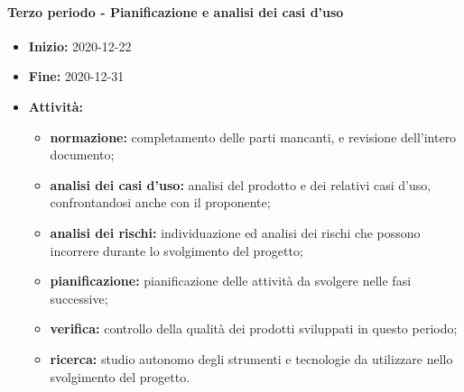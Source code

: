 \paragraph[Terzo periodo]{Terzo periodo - \textnormal{Pianificazione e analisi dei casi d'uso}}
\begin{itemize}
    \item [] \textbf{Inizio:} 2020-12-22
    \item [] \textbf{Fine:} 2020-12-31
    \item [] \textbf{Attività:}
          \begin{itemize}
              \item \textbf{normazione:} completamento delle parti mancanti, e revisione dell'intero documento;
              \item \textbf{analisi dei casi d'uso:} analisi del prodotto e dei relativi casi d'uso, confrontandosi anche con il proponente;
              \item \textbf{analisi dei rischi:} individuazione ed analisi dei rischi che possono incorrere durante lo svolgimento del progetto;
              \item \textbf{pianificazione:} pianificazione delle attività da svolgere nelle fasi successive;
              \item \textbf{verifica:} controllo della qualità dei prodotti sviluppati in questo periodo;
              \item \textbf{ricerca:} studio autonomo degli strumenti e tecnologie da utilizzare nello svolgimento del progetto.
          \end{itemize}
\end{itemize}

